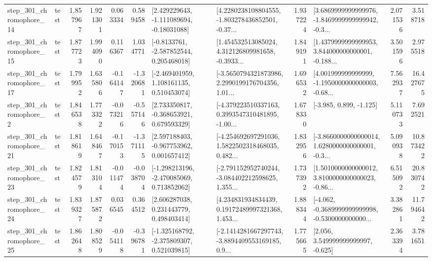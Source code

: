 \begin{tabular}{llrrrrllrlrr}
  step\_301\_chromophore\_14 &      test &      1.857967 &    1.921301 &      0.063334 &  0.589458 &    [2.429229643, -1.111089694, -0.18031088] &  [4.2280238108804555, -1.803278436852501, -0.37... &       1.937224 &  [3.6869999999999976, -1.8469999999999942, -0.3... &            2.071536 &          3.518718 \\
  step\_301\_chromophore\_15 &      test &      1.877723 &    1.994090 &      0.116367 &  1.034771 &     [-0.8133761, -2.587852544, 0.205468018] &  [1.454532513085024, 4.312126809981658, -0.3933... &       1.849191 &  [1.4379999999999953, 3.844000000000001, -0.188... &            3.501596 &          2.975518 \\
  step\_301\_chromophore\_17 &      test &      1.799952 &    1.635806 &     -0.164147 & -1.320681 &    [-2.469401959, 1.108161135, 0.510453074] &  [-3.5650794321873986, 2.2990199176704356, 1.01... &       1.696532 &  [4.001999999999999, -1.1950000000000003, -0.68... &            7.562937 &         16.427675 \\
   step\_301\_chromophore\_2 &      test &      1.846538 &    1.773322 &     -0.073216 & -0.557146 &    [2.733350817, -0.368653921, 0.679593329] &  [-4.379223510337163, 0.3993547310481895, -1.00... &       1.678330 &                            [-3.985, 0.899, -1.125] &            5.110733 &          7.692521 \\
  step\_301\_chromophore\_21 &      test &      1.818619 &    1.648467 &     -0.170153 & -1.371115 &    [2.597188403, -0.967753962, 0.001657412] &  [-4.254692697291036, 1.5822502318468035, 0.482... &       1.832956 &  [-3.8660000000000014, 1.6280000000000001, -0.3... &            5.090938 &         10.873422 \\
  step\_301\_chromophore\_23 &      test &      1.824579 &    1.813104 &     -0.011474 & -0.038704 &   [-1.298213196, -2.470085069, 0.713852062] &  [-2.791152952740244, -3.084402212598625, 1.355... &       1.737392 &  [1.5010000000000012, 3.8100000000000023, -0.86... &            6.515092 &         20.830742 \\
  step\_301\_chromophore\_24 &      test &      1.839327 &    1.875872 &      0.036545 &  0.364512 &     [2.606287038, 0.231443779, 0.498403414] &  [4.234831934834439, 0.19172489997321368, 1.453... &       1.888344 &  [-4.062, -0.3689999999999998, -0.5300000000000... &            3.382861 &         11.794642 \\
  step\_301\_chromophore\_25 &      test &      1.862648 &    1.808529 &     -0.054118 & -0.396781 &   [-1.325168792, -2.375809307, 0.521039815] &  [-2.1414281667297743, -3.8894409553169185, 0.9... &       1.775665 &                 [2.056, 3.549999999999997, -0.625] &            2.363394 &          3.781651 \\

\end{tabular}
